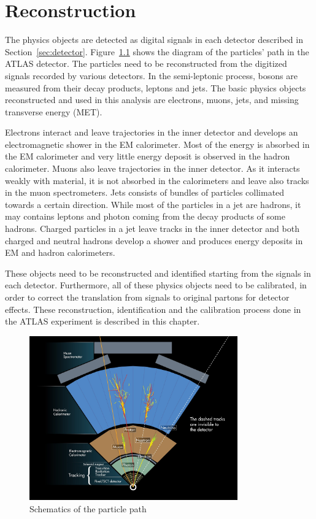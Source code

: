 \chapter{Reconstruction}

The physics objects are detected as digital signals in each detector described in Section~\ref{sec:detector}.
Figure~\ref{fig:ParticlePath} shows the diagram of the particles' path in the ATLAS detector. 
The particles need to be reconstructed from the digitized signals recorded by various detectors.
In the semi-leptonic process, bosons are measured from their decay products, leptons and jets.
The basic physics objects reconstructed and used in this analysis are electrons, muons, jets, and missing transverse energy (MET).

Electrons interact and leave trajectories in the inner detector and develops an electromagnetic shower in the EM calorimeter. Most of the energy is absorbed in the EM calorimeter and very little energy deposit is observed in the hadron calorimeter.
Muons also leave trajectories in the inner detector. As it interacts weakly with material, it is not absorbed in the calorimeters and leave also tracks in the muon spectrometers.
Jets consists of bundles of particles collimated towards a certain direction. While most of the particles in a jet are hadrons, it may contains leptons and photon coming from the decay products of some hadrons. Charged particles in a jet leave tracks in the inner detector and both charged and neutral hadrons develop a shower and produces energy deposits in EM and hadron calorimeters.

These objects need to be reconstructed and identified starting from the signals in each detector.
Furthermore, all of these physics objects need to be calibrated, in order to correct the translation from signals to original partons for detector effects.
These reconstruction, identification and the calibration process done in the ATLAS experiment is described in this chapter.

\begin{figure}[tbp]
\begin{center}
 \includegraphics[width=0.80\textwidth,keepaspectratio]{figures/Reconstruction/ParticlePath}
\caption{
Schematics of the particle path
}
\label{fig:ParticlePath}
\end{center}
\end{figure}

